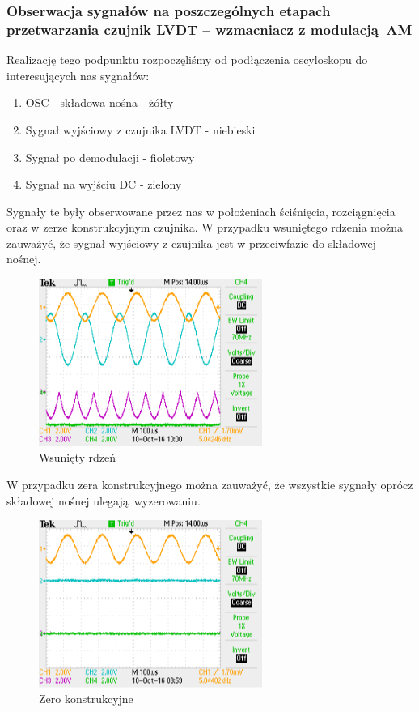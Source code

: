 \documentclass[a4paper, 12pt, titlepage]{article}
\begin{document}
			\subsubsection{Obserwacja sygnałów na poszczególnych etapach przetwarzania czujnik LVDT -- wzmacniacz z modulacją AM}
				Realizację tego podpunktu rozpoczęliśmy od podłączenia oscyloskopu do interesujących nas sygnałów:
				\begin{enumerate}
					\item OSC - składowa nośna - żółty
					\item Sygnał wyjściowy z czujnika LVDT - niebieski
					\item Sygnał po demodulacji - fioletowy
					\item Sygnał na wyjściu DC - zielony
				\end{enumerate}
				Sygnały te były obserwowane przez nas w położeniach ściśnięcia, rozciągnięcia oraz w zerze konstrukcyjnym czujnika.
				\newpage \noindent
				W przypadku wsuniętego rdzenia można zauważyć, że sygnał wyjściowy z czujnika jest w przeciwfazie do składowej nośnej.
				\begin{figure}[H]
					\centering
					\includegraphics[width=0.65\textwidth]{./img/scisniete.png}
					\caption{\small{Wsunięty rdzeń}}
				\end{figure} \noindent
				W przypadku zera konstrukcyjnego można zauważyć, że wszystkie sygnały oprócz składowej nośnej ulegają wyzerowaniu.
				\begin{figure}[H]
					\centering
					\includegraphics[width=0.65\textwidth]{./img/punkt_neutralny.png}
					\caption{\small{Zero konstrukcyjne}}
				\end{figure} \noindent
\end{document}

